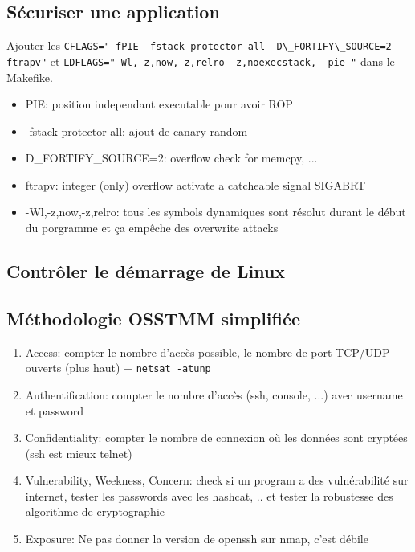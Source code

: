 \subsection{Sécuriser une application}
Ajouter les \verb!CFLAGS="-fPIE -fstack-protector-all -D\_FORTIFY\_SOURCE=2 -ftrapv"! et \verb!LDFLAGS="-Wl,-z,now,-z,relro -z,noexecstack, -pie "! dans le Makefike. 
\begin{itemize}
\item PIE: position independant executable pour avoir ROP
\item -fstack-protector-all: ajout de canary random
\item D\_FORTIFY\_SOURCE=2: overflow check for memcpy, ...
\item ftrapv: integer (only) overflow activate a catcheable signal SIGABRT
\item -Wl,-z,now,-z,relro: tous les symbols dynamiques sont résolut durant le début du porgramme et ça empêche des overwrite attacks
\end{itemize}

\subsection{Contrôler le démarrage de Linux}

\subsection{Méthodologie OSSTMM simplifiée}
\begin{enumerate}
\item Access: compter le nombre d'accès possible, le nombre de port TCP/UDP ouverts (plus haut) + \verb!netsat -atunp!
\item Authentification: compter le nombre d'accès (ssh, console, ...) avec username et password
\item Confidentiality: compter le nombre de connexion où les données sont cryptées (ssh est mieux telnet)
\item Vulnerability, Weekness, Concern: check si un program a des vulnérabilité sur internet, tester les passwords avec les hashcat, .. et tester la robustesse des algorithme de cryptographie
\item Exposure: Ne pas donner la version de openssh sur nmap, c'est débile
\end{enumerate}
